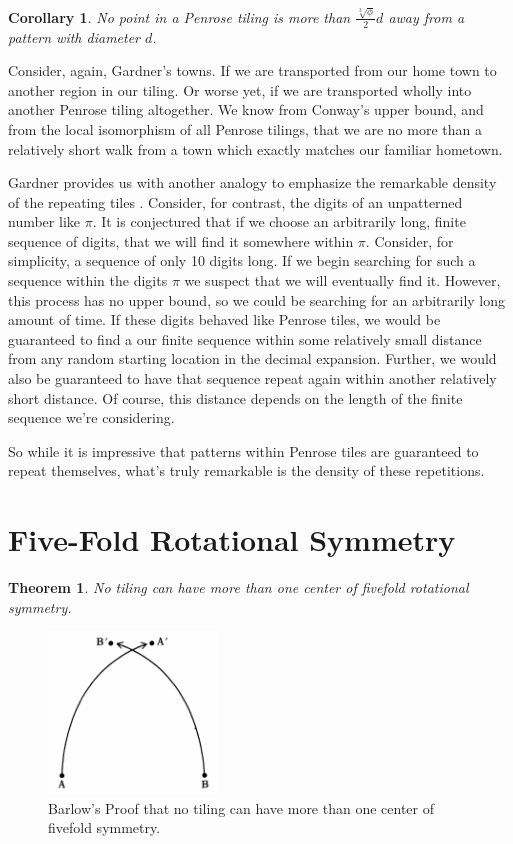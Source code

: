\documentclass[
  oneside,
  11pt, a4paper,
  footinclude=true,
  headinclude=true,
  cleardoublepage=empty
]{scrbook}
\newtheorem{mythm}{Theorem}
\newtheorem{mycor}{Corollary}
\begin{document}
\begin{mycor}
No point in a Penrose tiling is more than $\frac{\sqrt[3]{\phi}}{2}d$ away from a pattern with diameter $d$.
\end{mycor}

Consider, again, Gardner's towns. If we are transported from our home town to another region in our tiling. Or worse yet, if we are transported wholly into another Penrose tiling altogether. We know from Conway's upper bound, and from the local isomorphism of all Penrose tilings, that we are no more than a relatively short walk from a town which exactly matches our familiar hometown.

Gardner provides us with another analogy to emphasize the remarkable density of the repeating tiles  \cite{Gardner1997}. Consider, for contrast, the digits of an unpatterned number like $\pi$. It is conjectured that if we choose an arbitrarily long, finite sequence of digits, that we will find it somewhere within $\pi$. Consider, for simplicity, a sequence of only 10 digits long. If we begin searching for such a sequence within the digits $\pi$ we suspect that we will eventually find it. However, this process has no upper bound, so we could be searching for an arbitrarily long amount of time. If these digits behaved like Penrose tiles, we would be guaranteed to find a our finite sequence within some relatively small distance from any random starting location in the decimal expansion. Further, we would also be guaranteed to have that sequence repeat again within another relatively short distance. Of course, this distance depends on the length of the finite sequence we're considering.

So while it is impressive that patterns within Penrose tiles are guaranteed to repeat themselves, what's truly remarkable is the density of these repetitions. 
\section{Five-Fold Rotational Symmetry} %
\begin{mythm}
No tiling can have more than one center of fivefold rotational symmetry.
\label{symthm}
\end{mythm}

\begin{figure}[H]
	\centering
	\includegraphics[width=0.4\textwidth]{proof}
    \caption[Proof of No Periodic Five-fold Symmetry]{Barlow's Proof that no tiling can have more than one center of fivefold symmetry. \cite{Gardner1997}}
    \label{fig:fivefoldproof}
\end{figure}
\end{document}
